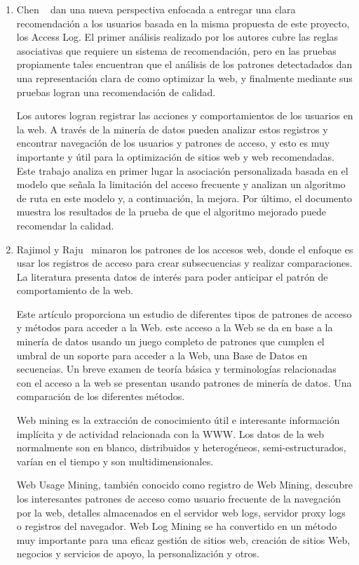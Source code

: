 \begin{enumerate}
  \item Chen \etal~\cite{Chen2011} dan una nueva perspectiva enfocada a entregar una clara recomendación a los usuarios basada en la misma propuesta de este proyecto, los Access Log.
  El primer análisis realizado por los autores cubre las reglas asociativas que requiere un sistema de recomendación, pero en las pruebas propiamente tales encuentran que el análisis de los patrones detectadados dan una representación clara de como optimizar la web, y finalmente mediante sus pruebas logran una recomendación de calidad.
  
  Los autores logran registrar las acciones y comportamientos de los usuarios en la web. A través de la minería de datos pueden analizar estos registros y encontrar navegación de los usuarios y patrones de acceso, y esto es muy importante y útil para la optimización de sitios web y web recomendadas. Este trabajo analiza en primer lugar la asociación personalizada basada en el modelo que señala la limitación del acceso frecuente y analizan un algoritmo de ruta en este modelo y, a continuación, la mejora. Por último, el documento muestra los resultados de la prueba de que el algoritmo mejorado puede recomendar la calidad.
  

  \item Rajimol y Raju~\cite{Rajimol2012} minaron los patrones de los accesos web, donde el enfoque es usar los registros de acceso para crear subsecuencias y realizar comparaciones.
  La literatura presenta datos de interés para poder anticipar el patrón de comportamiento de la web.
  
  Este artículo proporciona un estudio de diferentes tipos de  patrones de acceso y métodos para acceder a la Web.  este acceso a la Web se da en base a la minería de datos  usando un juego completo de patrones que cumplen el umbral de un soporte para acceder a la Web, una Base de Datos en secuencias. Un breve examen de teoría básica y terminologías relacionadas con el acceso a la web se presentan usando patrones de minería de datos. Una comparación de los diferentes métodos.
  
  Web mining es la extracción de conocimiento útil e interesante información implícita y de actividad relacionada con la WWW. Los datos de la web normalmente son en blanco, distribuidos y heterogéneos, semi-estructurados, varían en el tiempo y son multidimensionales.
  
  Web Usage Mining, también conocido como registro de Web Mining, descubre los interesantes  patrones de acceso como usuario frecuente de la navegación por la web, detalles almacenados en el servidor web logs, servidor proxy logs o registros del navegador.  Web Log Mining se ha convertido en un método muy importante para una eficaz gestión de sitios web, creación de sitios Web, negocios y servicios de apoyo, la personalización y otros.



\end{enumerate}

